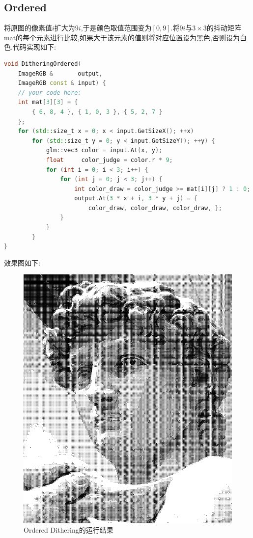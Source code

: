\documentclass{ctexart}
\begin{document}
\subsection*{Ordered}
将原图的像素值$i$扩大为$9i$,于是颜色取值范围变为$[0,9]$.将$9i$与$3\times3$的抖动矩阵{\codefont mat}的每个元素进行比较,如果大于该元素的值则将对应位置设为黑色,否则设为白色.代码实现如下:
\begin{lstlisting}[language=C++]
void DitheringOrdered(
    ImageRGB &       output,
    ImageRGB const & input) {
    // your code here:
    int mat[3][3] = {
        { 6, 8, 4 }, { 1, 0, 3 }, { 5, 2, 7 }
    };
    for (std::size_t x = 0; x < input.GetSizeX(); ++x)
        for (std::size_t y = 0; y < input.GetSizeY(); ++y) {
            glm::vec3 color = input.At(x, y);
            float     color_judge = color.r * 9;
            for (int i = 0; i < 3; i++) {
                for (int j = 0; j < 3; j++) {
                    int color_draw = color_judge >= mat[i][j] ? 1 : 0;
                    output.At(3 * x + i, 3 * y + j) = {
                        color_draw, color_draw, color_draw, };
                }
            }
        }
}
\end{lstlisting}
效果图如下:
\begin{figure}[H]
    \centering\includegraphics[scale=0.5]{figure/Ordered.png}
    \caption{Ordered Dithering的运行结果}
\end{figure}
\end{document}
